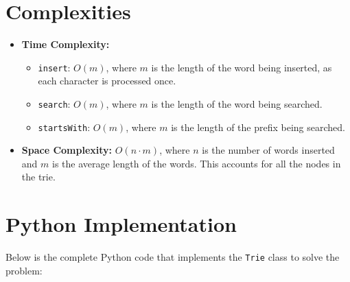 \section*{Complexities}

\begin{itemize}
    \item \textbf{Time Complexity:}
    \begin{itemize}
        \item \texttt{insert}: \(O(m)\), where \(m\) is the length of the word being inserted, as each character is processed once.
        \item \texttt{search}: \(O(m)\), where \(m\) is the length of the word being searched.
        \item \texttt{startsWith}: \(O(m)\), where \(m\) is the length of the prefix being searched.
    \end{itemize}
    \item \textbf{Space Complexity:} \(O(n \cdot m)\), where \(n\) is the number of words inserted and \(m\) is the average length of the words. This accounts for all the nodes in the trie.
\end{itemize}

\section*{Python Implementation}


Below is the complete Python code that implements the \texttt{Trie} class to solve the problem:

